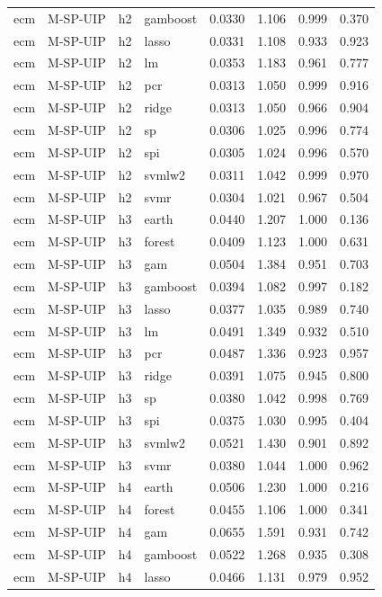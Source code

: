 \begin{ThreePartTable}
\begin{longtable}[t]{llclcccc}
ecm & M-SP-UIP & h2 & gamboost & 0.0330 & 1.106 & 0.999 & 0.370\\
ecm & M-SP-UIP & h2 & lasso & 0.0331 & 1.108 & 0.933 & 0.923\\
ecm & M-SP-UIP & h2 & lm & 0.0353 & 1.183 & 0.961 & 0.777\\
ecm & M-SP-UIP & h2 & pcr & 0.0313 & 1.050 & 0.999 & 0.916\\
ecm & M-SP-UIP & h2 & ridge & 0.0313 & 1.050 & 0.966 & 0.904\\
ecm & M-SP-UIP & h2 & sp & 0.0306 & 1.025 & 0.996 & 0.774\\
ecm & M-SP-UIP & h2 & spi & 0.0305 & 1.024 & 0.996 & 0.570\\
ecm & M-SP-UIP & h2 & svmlw2 & 0.0311 & 1.042 & 0.999 & 0.970\\
ecm & M-SP-UIP & h2 & svmr & 0.0304 & 1.021 & 0.967 & 0.504\\
\addlinespace
ecm & M-SP-UIP & h3 & earth & 0.0440 & 1.207 & 1.000 & 0.136\\
ecm & M-SP-UIP & h3 & forest & 0.0409 & 1.123 & 1.000 & 0.631\\
ecm & M-SP-UIP & h3 & gam & 0.0504 & 1.384 & 0.951 & 0.703\\
ecm & M-SP-UIP & h3 & gamboost & 0.0394 & 1.082 & 0.997 & 0.182\\
ecm & M-SP-UIP & h3 & lasso & 0.0377 & 1.035 & 0.989 & 0.740\\
ecm & M-SP-UIP & h3 & lm & 0.0491 & 1.349 & 0.932 & 0.510\\
ecm & M-SP-UIP & h3 & pcr & 0.0487 & 1.336 & 0.923 & 0.957\\
ecm & M-SP-UIP & h3 & ridge & 0.0391 & 1.075 & 0.945 & 0.800\\
ecm & M-SP-UIP & h3 & sp & 0.0380 & 1.042 & 0.998 & 0.769\\
ecm & M-SP-UIP & h3 & spi & 0.0375 & 1.030 & 0.995 & 0.404\\
ecm & M-SP-UIP & h3 & svmlw2 & 0.0521 & 1.430 & 0.901 & 0.892\\
ecm & M-SP-UIP & h3 & svmr & 0.0380 & 1.044 & 1.000 & 0.962\\
\addlinespace
ecm & M-SP-UIP & h4 & earth & 0.0506 & 1.230 & 1.000 & 0.216\\
ecm & M-SP-UIP & h4 & forest & 0.0455 & 1.106 & 1.000 & 0.341\\
ecm & M-SP-UIP & h4 & gam & 0.0655 & 1.591 & 0.931 & 0.742\\
ecm & M-SP-UIP & h4 & gamboost & 0.0522 & 1.268 & 0.935 & 0.308\\
ecm & M-SP-UIP & h4 & lasso & 0.0466 & 1.131 & 0.979 & 0.952\\

\end{longtable}
\end{ThreePartTable}
